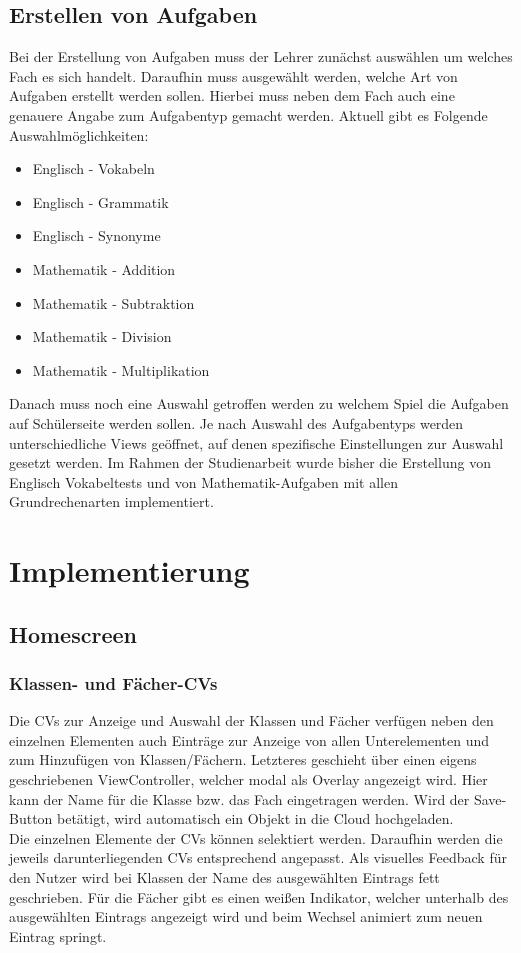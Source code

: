 \subsection{Erstellen von Aufgaben}
Bei der Erstellung von Aufgaben muss der Lehrer zunächst auswählen um welches Fach es sich handelt. Daraufhin muss ausgewählt werden, welche Art von Aufgaben erstellt werden sollen. Hierbei muss neben dem Fach auch eine genauere Angabe zum Aufgabentyp gemacht werden. Aktuell gibt es Folgende Auswahlmöglichkeiten:
\begin{itemize}
\item Englisch - Vokabeln
\item Englisch - Grammatik
\item Englisch - Synonyme
\item Mathematik - Addition
\item Mathematik - Subtraktion
\item Mathematik - Division
\item Mathematik - Multiplikation
\end{itemize}
Danach muss noch eine Auswahl getroffen werden zu welchem Spiel die Aufgaben auf Schülerseite werden sollen.
Je nach Auswahl des Aufgabentyps werden unterschiedliche Views geöffnet, auf denen spezifische Einstellungen zur Auswahl gesetzt werden.
Im Rahmen der Studienarbeit wurde bisher die Erstellung von Englisch Vokabeltests und von Mathematik-Aufgaben mit allen Grundrechenarten implementiert.


\section{Implementierung}
\subsection{Homescreen}

\subsubsection{Klassen- und Fächer-CVs}
Die CVs zur Anzeige und Auswahl der Klassen und Fächer verfügen neben den einzelnen Elementen auch Einträge zur Anzeige von allen Unterelementen und zum Hinzufügen von Klassen/Fächern.
Letzteres geschieht über einen eigens geschriebenen ViewController, welcher modal als Overlay angezeigt wird. Hier kann der Name für die Klasse bzw. das Fach eingetragen werden. Wird der Save-Button betätigt, wird automatisch ein Objekt in die Cloud hochgeladen.\\Die einzelnen Elemente der CVs können selektiert werden. Daraufhin werden die jeweils darunterliegenden CVs entsprechend angepasst. Als visuelles Feedback für den Nutzer wird bei Klassen der Name des ausgewählten Eintrags fett geschrieben. Für die Fächer gibt es einen weißen Indikator, welcher unterhalb des ausgewählten Eintrags angezeigt wird und beim Wechsel animiert zum neuen Eintrag springt.

